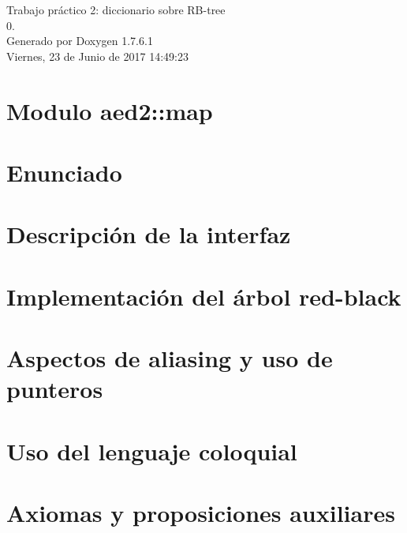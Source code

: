 \documentclass[a4paper]{article}
\begin{document}
\hypersetup{pageanchor=false,citecolor=blue}
\begin{titlepage}
\vspace*{7cm}
\begin{center}
{\Large \-Trabajo práctico 2\-: diccionario sobre \-R\-B-\/tree \\[1ex]\large 0. }\\
\vspace*{1cm}
{\large \-Generado por Doxygen 1.7.6.1}\\
\vspace*{0.5cm}
{\small Viernes, 23 de Junio de 2017 14:49:23}\\
\end{center}
\end{titlepage}
\tableofcontents
{}
\hypersetup{pageanchor=true,citecolor=blue}
\section{\-Modulo aed2\-:\-:map}
\label{index}\hypertarget{index}{}
\section{\-Enunciado}
\label{Enunciado}
\hypertarget{Enunciado}{}

\section{\-Descripción de la interfaz}
\label{Interfaz}
\hypertarget{Interfaz}{}

\section{\-Implementación del árbol red-\/black}
\label{Implementacion}
\hypertarget{Implementacion}{}

\section{\-Aspectos de aliasing y uso de punteros}
\label{Aliasing}
\hypertarget{Aliasing}{}

\section{\-Uso del lenguaje coloquial}
\label{Castellano}
\hypertarget{Castellano}{}

\section{\-Axiomas y proposiciones auxiliares}
\label{axiomas}
\hypertarget{axiomas}{}

\end{document}
